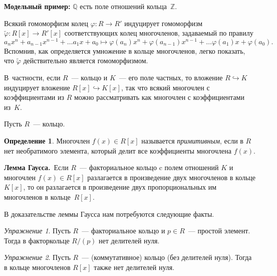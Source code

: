\documentclass[a4paper,10pt]{amsart}
\def\ZZ{{\mathbb Z}}%
\def\QQ{{\mathbb Q}}%
\theoremstyle{definition}
\newtheorem{definition}{Определение}
\theoremstyle{remark}
\newtheorem{exercise}{Упражнение}
\begin{document}
\textbf{Модельный пример:} $\QQ$ есть поле отношений кольца~$\ZZ$.

Всякий гомоморфизм колец $\varphi \colon R \to R'$ индуцирует
гомоморфизм $\widetilde \varphi \colon R[x] \to R'[x]$
соответствующих колец многочленов, задаваемый по правилу
$$
a_n x^n + a_{n-1} x^{n-1} + \ldots a_1 x + a_0 \mapsto \varphi(a_n)
x^n + \varphi(a_{n-1}) x^{n-1} + \ldots \varphi(a_1) x +
\varphi(a_0).
$$
Вспомнив, как определяется умножение в кольце многочленов, легко
показать, что $\widetilde \varphi$ действительно является
гомоморфизмом.

В~частности, если $R$~--- кольцо и $K$~--- его поле частных, то
вложение $R \hookrightarrow K$ индуцирует вложение $R[x]
\hookrightarrow K[x]$, так что всякий многочлен с коэффициентами из
$R$ можно рассматривать как многочлен с коэффициентами из~$K$.

Пусть $R$~--- кольцо.

\begin{definition}
Многочлен $f(x)\in R[x]$ называется {\it примитивным}, если в $R$
нет необратимого элемента, который делит все коэффициенты многочлена
$f(x)$.
\end{definition}

{\bf Лемма Гаусса.}\ Если $R$~--- факториальное кольцо c полем
отношений $K$ и многочлен $f(x) \in R[x]$ разлагается в произведение
двух многочленов в кольце $K[x]$, то он разлагается в произведение
двух пропорциональных им многочленов в кольце~$R[x]$.

В доказательстве леммы Гаусса нам потребуются следующие факты.

\begin{exercise} \label{ex_1}
Пусть $R$~--- факториальное кольцо и $p \in R$~--- простой элемент.
Тогда в факторкольце $R/(p)$ нет делителей нуля.
\end{exercise}

\begin{exercise} \label{ex_2}
Пусть $R$~--- (коммутативное) кольцо (без делителей нуля). Тогда в
кольце многочленов $R[x]$ также нет делителей нуля.
\end{exercise}
\end{document}
